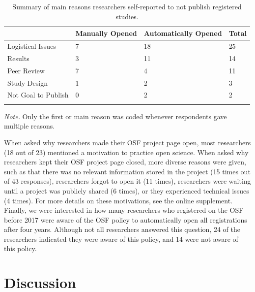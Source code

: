 \documentclass[
  ,man, a4paper,floatsintext]{apa6}
\begin{document}
\begin{table}[tbp]

\begin{center}
\begin{threeparttable}

\caption{\label{tab:table-reasons}Summary of main reasons researchers self-reported to not publish registered studies.}

\begin{tabular}{llll}
\toprule
 & \multicolumn{1}{c}{Manually Opened} & \multicolumn{1}{c}{Automatically Opened} & \multicolumn{1}{c}{Total}\\
\midrule
Logistical Issues & 7 & 18 & 25\\
Results & 3 & 11 & 14\\
Peer Review & 7 & 4 & 11\\
Study Design & 1 & 2 & 3\\
Not Goal to Publish & 0 & 2 & 2\\
\bottomrule
\addlinespace
\end{tabular}

\begin{tablenotes}[para]
\normalsize{\textit{Note.} Only the first or main reason was coded whenever respondents gave multiple reasons.}
\end{tablenotes}

\end{threeparttable}
\end{center}

\end{table}

When asked why researchers made their OSF project page open, most researchers (18 out of 23) mentioned a motivation to practice open science. When asked why researchers kept their OSF project page closed, more diverse reasons were given, such as that there was no relevant information stored in the project (15 times out of 43 responses), researchers forgot to open it (11 times), researchers were waiting until a project was publicly shared (6 times), or they experienced technical issues (4 times). For more details on these motivations, see the online supplement. Finally, we were interested in how many researchers who registered on the OSF before 2017 were aware of the OSF policy to automatically open all registrations after four years. Although not all researchers answered this question, 24 of the researchers indicated they were aware of this policy, and 14 were not aware of this policy.

\section{Discussion}\label{discussion}
\end{document}
